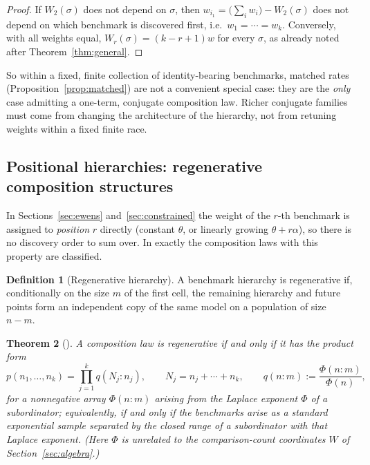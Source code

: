 \documentclass[11pt]{article}
\theoremstyle{plain}
\newtheorem{theorem}{Theorem}[section]
\theoremstyle{definition}
\newtheorem{definition}[theorem]{Definition}
\begin{document}
\begin{proof}
If \(W_2(\sigma)\) does not depend on \(\sigma\), then \(w_{i_1}=\bigl(\sum_iw_i\bigr)-W_2(\sigma)\) does not depend on which benchmark is discovered first, i.e.\ \(w_1=\cdots=w_k\). Conversely, with all weights equal, \(W_r(\sigma)=(k-r+1)w\) for every \(\sigma\), as already noted after Theorem~\ref{thm:general}.
\end{proof}

So within a fixed, finite collection of identity-bearing benchmarks, matched rates (Proposition~\ref{prop:matched}) are not a convenient special case: they are the \emph{only} case admitting a one-term, conjugate composition law. Richer conjugate families must come from changing the architecture of the hierarchy, not from retuning weights within a fixed finite race.

\subsection{Positional hierarchies: regenerative composition structures}

In Sections~\ref{sec:ewens} and~\ref{sec:constrained} the weight of the \(r\)-th benchmark is assigned to \emph{position} \(r\) directly (constant \(\theta\), or linearly growing \(\theta+r\alpha\)), so there is no discovery order to sum over. In \cite{GnedinPitman2005} exactly the composition laws with this property are classified.

\begin{definition}[Regenerative hierarchy]
\label{def:regenerative}
A benchmark hierarchy is regenerative if, conditionally on the size \(m\) of the first cell, the remaining hierarchy and future points form an independent copy of the same model on a population of size \(n-m\).
\end{definition}

\begin{theorem}[{\cite[Prop.~3.1, Thm.~5.2]{GnedinPitman2005}}]
\label{thm:regenerative}
A composition law is regenerative if and only if it has the product form
\[
p(n_1,\ldots,n_k)=\prod_{j=1}^k q(N_j:n_j),\qquad N_j=n_j+\cdots+n_k,\qquad q(n:m):=\frac{\Phi(n:m)}{\Phi(n)},
\]
for a nonnegative array \(\Phi(n:m)\) arising from the Laplace exponent \(\Phi\) of a subordinator; equivalently, if and only if the benchmarks arise as a standard exponential sample separated by the closed range of a subordinator with that Laplace exponent. (Here \(\Phi\) is unrelated to the comparison-count coordinates \(W\) of Section~\ref{sec:algebra}.)
\end{theorem}
\end{document}
